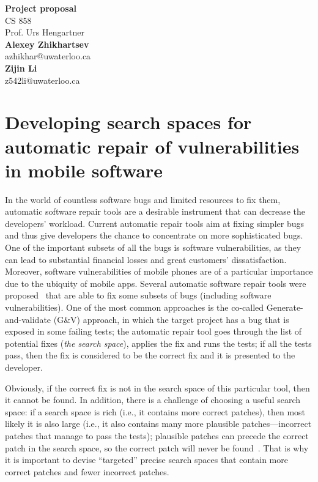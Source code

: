 \documentclass[letterpaper, 11pt]{article}
\begin{document}
\begin{multicols}{3}
\noindent
\large\textbf{Project proposal}\\
\normalsize CS 858\\
Prof. Urs Hengartner\\

\noindent
\textbf{Alexey Zhikhartsev}\\
azhikhar@uwaterloo.ca\\

\noindent
\textbf{Zijin Li}\\
z542li@uwaterloo.ca
\end{multicols}

\section*{Developing search spaces for automatic repair of vulnerabilities in mobile software}

In the world of countless software bugs and limited resources to fix them, automatic software repair tools are a desirable instrument that can decrease the developers' workload. Current automatic repair tools aim at fixing simpler bugs and thus give developers the chance to concentrate on more sophisticated bugs. One of the important subsets of all the bugs is software vulnerabilities, as they can lead to substantial financial losses and great customers' dissatisfaction. Moreover, software vulnerabilities of mobile phones are of a particular importance due to the ubiquity of mobile apps. Several automatic software repair tools were proposed~\cite{le2012systematic, long2015staged, mechtaev2016angelix} that are able to fix some subsets of bugs (including software vulnerabilities). One of the most common approaches is the co-called Generate-and-validate (G\&V) approach, in which the target project has a bug that is exposed in some failing tests; the automatic repair tool goes through the list of potential fixes (\emph{the search space}), applies the fix and runs the tests; if all the tests pass, then the fix is considered to be the correct fix and it is presented to the developer.

Obviously, if the correct fix is not in the search space of this particular tool, then it cannot be found. In addition, there is a challenge of choosing a useful search space: if a search space is rich (i.e., it contains more correct patches), then most likely it is also large (i.e., it also contains many more plausible patches---incorrect patches that manage to pass the tests); plausible patches can precede the correct patch in the search space, so the correct patch will never be found~\cite{long2016analysis}. That is why it is important to devise ``targeted'' precise search spaces that contain more correct patches and fewer incorrect patches.
\end{document}

